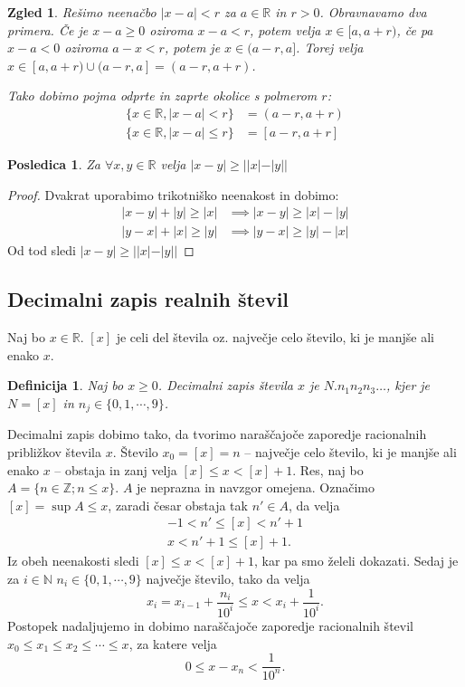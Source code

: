 \documentclass[10pt, a4paper]{article}
\newtheorem{posledica}[izr]{Posledica}
\newtheorem{defi}[izr]{Definicija}
\newenvironment{noticeB}{%
  \tcolorbox[%
  notitle,
  empty,
  enhanced,  %
  breakable,
  coltext=black,
  colback=white, 
  fontupper=\rmfamily,
  noparskip,
  sharp corners,
  boxrule=-1pt,  %
  frame hidden,
  left=7pt,  %
  right=7pt,
  top=5pt,
  bottom=5pt,
  before skip=2.5ex plus 2pt,
  after skip=2.5ex plus 2pt,
  borderline west = {1.5pt}{-0.1pt}{blue!30!black}, %
  overlay unbroken and last={%
    \draw[color=black, line width=1.25pt]
    ($(frame.south west)+(1.pt, -0.1pt)$) -- ++(2em, 0);
  }
  ]}
{\endtcolorbox}
\newenvironment{definicija}{\begin{noticeB}\begin{defi}}{%
\end{defi}\end{noticeB}}
\newtheorem{zgled}[izr]{Zgled}
\newenvironment{noticeC}{%
  \tcolorbox[%
  notitle,
  empty,
  enhanced,  %
  breakable,
  coltext=black, 
  fontupper=\rmfamily,
  noparskip,
  sharp corners,
  boxrule=-1pt,  %
  frame hidden,
  left=7pt,  %
  right=7pt,
  top=5pt,
  bottom=5pt,
  before skip=2.5ex plus 2pt,
  after skip=2.5ex plus 2pt,
  overlay unbroken and last={%
  },
  ]}
{\endtcolorbox}
\newenvironment{dokaz}%
  {\begin{noticeC}\begin{proof}}%
  {\end{proof}\end{noticeC}}
\newcommand{\N}{\mathbb {N}}
\newcommand{\Z}{\mathbb {Z}}
\newcommand{\R}{\mathbb {R}}
\begin{document}
\begin{zgled}
    Rešimo neenačbo $|x-a|<r$ za $a\in \R$ in $r>0$.
    Obravnavamo dva primera. Če je $x-a \geq 0$ oziroma $x-a<r$, potem velja $x \in [a, a+r)$, če pa $x-a<0$ oziroma $a-x < r$, potem je $x \in (a-r, a]$.
    Torej velja $x \in [a, a+r) \cup (a-r, a] = (a-r, a+r)$.

    Tako dobimo pojma {odprte} in {zaprte okolice} s polmerom $r$:
    \begin{align*}
        \{x \in \R, |x-a| < r\} &= (a-r, a+r)\\
        \{x \in \R, |x-a| \leq r\} &= [a-r, a+r]
    \end{align*}
\end{zgled}

\begin{posledica}
    Za $\forall x,y \in \R$ velja $|x-y| \geq ||x|-|y||$
\end{posledica}

\begin{dokaz}
        Dvakrat uporabimo trikotniško neenakost in dobimo:
        \begin{align*}
            |x-y|+ |y| \geq |x| &\implies |x-y| \geq |x|-|y|\\
            |y-x| + |x| \geq |y| &\implies |y-x| \geq |y|-|x|
        \end{align*}
        Od tod sledi $|x-y| \geq ||x|-|y||$
\end{dokaz}

\subsection{Decimalni zapis realnih števil}

Naj bo $x \in \R$. $[x]$ je celi del števila oz. največje celo število, ki je manjše ali enako $x$.

\begin{definicija}
    Naj bo $x \geq 0$. Decimalni zapis števila $x$ je $N.n_1 n_2 n_3 \dots$, kjer je $N=[x]$ in $n_j \in \{0,1,\cdots,9\}$. 
\end{definicija} 

Decimalni zapis dobimo tako, da tvorimo naraščajoče zaporedje racionalnih približkov števila $x$.
Število $x_0 = [x]= n$ -- največje celo število, ki je manjše ali enako $x$ -- obstaja in zanj velja $[x] \leq x < [x] + 1$. Res, naj bo $A = \{n \in \Z; n \leq x\}$. 
$A$ je neprazna in navzgor omejena. Označimo $[x] = \sup A \leq x$, zaradi česar obstaja tak $n' \in A$, da velja 
\begin{gather*}
    [x]-1 <n'\leq [x] < n' + 1\\
    x < n' + 1 \leq [x] + 1.
\end{gather*}
Iz obeh neenakosti sledi $[x] \leq x < [x] + 1$, kar pa smo želeli dokazati.
Sedaj je za $i \in \N$ $n_i \in \{0,1,\cdots, 9\}$ največje število, tako da velja $$x_i = x_{i-1} + \frac{n_i}{10^i} \leq x < x_i + \frac{1}{10^i}.$$
Postopek nadaljujemo in dobimo naraščajoče zaporedje racionalnih števil $x_0 \leq x_1 \leq x_2 \leq \cdots \leq x$, za katere velja $$0 \leq x-x_n < \frac{1}{10^n}.$$
\end{document}
